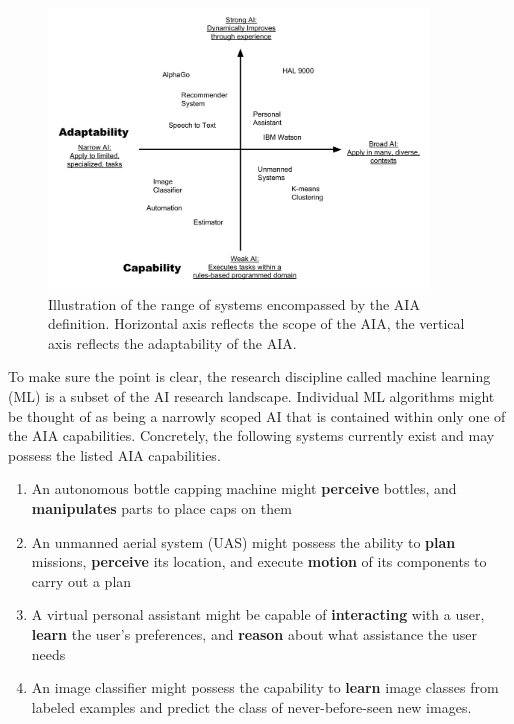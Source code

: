 	\begin{figure}[htbp]
    	\centering
     	\includegraphics[width=0.9\textwidth]{Figures/strong_weak_narrow_broad.pdf}
    	\caption{Illustration of the range of systems encompassed by the AIA definition. Horizontal axis reflects the scope of the AIA, the vertical axis reflects the adaptability of the AIA.}
        \label{fig:StrongWeak}
    \end{figure}

    To make sure the point is clear, the research discipline called machine learning (ML) is a subset of the AI research landscape. Individual ML algorithms might be thought of as being a narrowly scoped AI that is contained within only one of the AIA capabilities.  Concretely, the following systems currently exist and may possess the listed AIA capabilities.

    \begin{enumerate}
         \item An autonomous bottle capping machine might \textbf{perceive} bottles, and \textbf{manipulates} parts to place caps on them
         \item An unmanned aerial system (UAS) might possess the ability to \textbf{plan} missions, \textbf{perceive} its location, and execute \textbf{motion} of its components to carry out a plan
         \item A virtual personal assistant might be capable of \textbf{interacting} with a user, \textbf{learn} the user's preferences, and \textbf{reason} about what assistance the user needs
         \item An image classifier might possess the capability to \textbf{learn} image classes from labeled examples and predict the class of never-before-seen new images.
     \end{enumerate}


